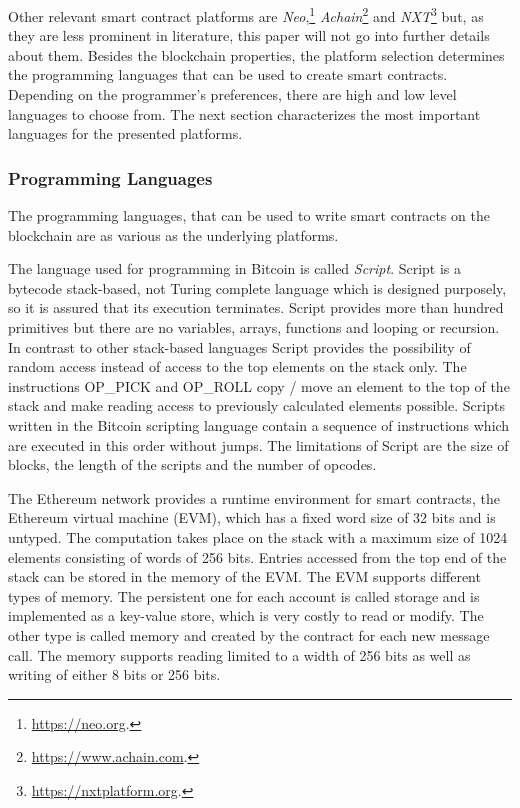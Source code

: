 \documentclass[conference]{IEEEtran}
\begin{document}
Other relevant smart contract platforms are \textit{Neo},\footnote{\url{https://neo.org}.} \textit{Achain}\footnote{\url{https://www.achain.com}.} and \textit{NXT}\footnote{\url{https://nxtplatform.org}.} but, as they are less prominent in literature, this paper will not go into further details about them.  
Besides the blockchain properties, the platform selection determines the programming languages that can be used to create smart contracts. Depending on the programmer's preferences, there are high and low level languages to choose from. The next section characterizes the most important languages for the presented platforms.
\subsubsection{Programming Languages}
The programming languages, that can be used to write smart contracts on the blockchain are as various as the underlying platforms. \par 
The language used for programming in Bitcoin is called \textit{Script}. Script is a bytecode stack-based, not Turing complete language which is designed purposely, so it is assured that its execution terminates. Script provides more than hundred primitives but there are no variables, arrays, functions and looping or recursion. In contrast to other stack-based languages Script provides the possibility of random access instead of access to the top elements on the stack only. The instructions OP\_PICK and OP\_ROLL copy / move an element to the top of the stack and make reading access to previously calculated elements possible. Scripts written in the Bitcoin scripting language contain a sequence of instructions which are executed in this order without jumps. The limitations of Script are the size of blocks, the length of the scripts and the number of opcodes. \cite{McAdams2017} \par 
The Ethereum network provides a runtime environment for smart contracts, the Ethereum virtual machine (EVM), which has a fixed word size of 32 bits and is untyped. The computation takes place on the stack with a maximum size of 1024 elements consisting of words of 256 bits. Entries accessed from the top end of the stack can be stored in the memory of the EVM. The EVM supports different types of memory. The persistent one for each account is called storage and is implemented as a key-value store, which is very costly to read or modify. The other type is called memory and created by the contract for each new message call. The memory supports reading limited to a width of 256 bits as well as writing of either 8 bits or 256 bits. \cite{Solidity2017} \par 
\end{document}

